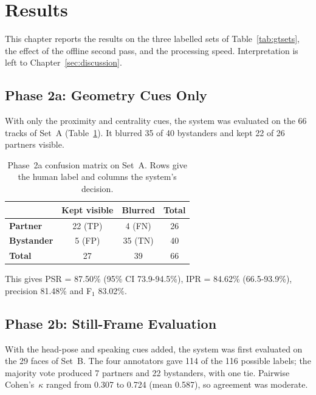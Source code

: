 \section{Results}
\label{sec:results}

This chapter reports the results on the three labelled sets of Table~\ref{tab:gtsets},
the effect of the offline second pass, and the processing speed. Interpretation is left
to Chapter~\ref{sec:discussion}.

\subsection{Phase 2a: Geometry Cues Only}
\label{sec:results_2a}

With only the proximity and centrality cues, the system was evaluated on the 66 tracks of
Set~A (Table~\ref{tab:confusion_2a}). It blurred 35 of 40 bystanders and kept 22 of 26
partners visible.

\begin{table}[htbp]
\begin{singlespace}
\centering
\caption{Phase~2a confusion matrix on Set~A. Rows give the human label and columns the
system's decision.}
\label{tab:confusion_2a}
\renewcommand{\arraystretch}{1.3}
\begin{tabular}{@{}lccc@{}}
\toprule
 & \textbf{Kept visible} & \textbf{Blurred} & \textbf{Total} \\
\midrule
\textbf{Partner}   & 22 (TP) & 4 (FN)  & 26 \\
\textbf{Bystander} & 5 (FP)  & 35 (TN) & 40 \\
\textbf{Total}     & 27      & 39      & 66 \\
\bottomrule
\end{tabular}
\end{singlespace}
\end{table}

This gives PSR = 87.50\% (95\% CI 73.9-94.5\%), IPR = 84.62\% (66.5-93.9\%),
precision 81.48\% and F$_1$ 83.02\%.

\subsection{Phase 2b: Still-Frame Evaluation}
\label{sec:results_2b}

With the head-pose and speaking cues added, the system was first evaluated on the 29 faces
of Set~B. The four annotators gave 114 of the 116 possible labels; the majority vote
produced 7 partners and 22 bystanders, with one tie. Pairwise Cohen's~$\kappa$ ranged
from 0.307 to 0.724 (mean 0.587), so agreement was moderate.

